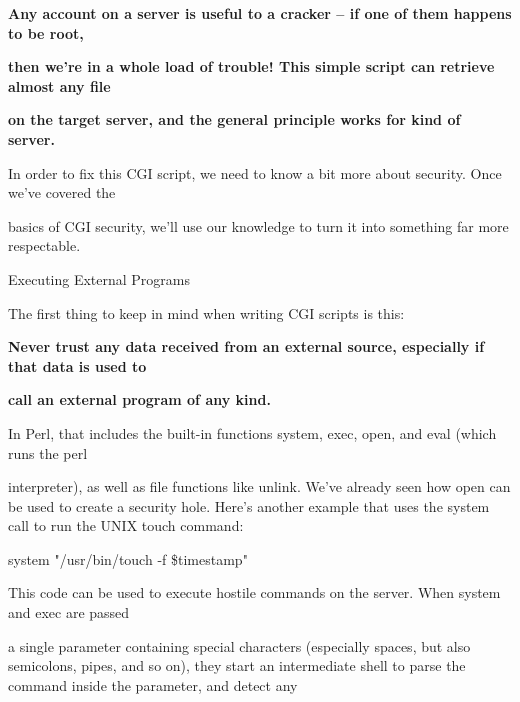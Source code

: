 \documentclass[a4paper,11pt]{book}
\begin{document}
\noindent 

\noindent 

\noindent \textbf{Any account on a server is useful to a cracker -- if one of them happens to be root,}

\noindent \textbf{then we're in a whole load of trouble!  This simple script can retrieve almost any file}

\noindent \textbf{on the target server, and the general principle works for  kind of server.}

\noindent 

\noindent 

\noindent In order to fix this CGI script, we need to know a bit more about security. Once we've covered the

\noindent basics of CGI security, we'll use our knowledge to turn it into something far more respectable.

\noindent 

\noindent Executing External Programs

\noindent 

\noindent The first thing to keep in mind when writing CGI scripts is this:

\noindent 

\noindent 

\noindent \textbf{Never trust any data received from an external source, especially if that data is used to}

\noindent \textbf{call an external program of any kind.}

\noindent 

\noindent 

\noindent In Perl, that includes the built-in functions system, exec, open, and eval (which runs the perl

\noindent interpreter), as well as file functions like unlink. We've already seen how open can be used to create a security hole. Here's another example that uses the system call to run the UNIX touch command:

\noindent 

\noindent 

\noindent system "/usr/bin/touch -f \$timestamp"

\noindent 

\noindent This code can be used to execute hostile commands on the server. When system and exec are passed

\noindent a single parameter containing special characters (especially spaces, but also semicolons, pipes, and so on), they start an intermediate shell to parse the command inside the parameter, and detect any
\end{document}
